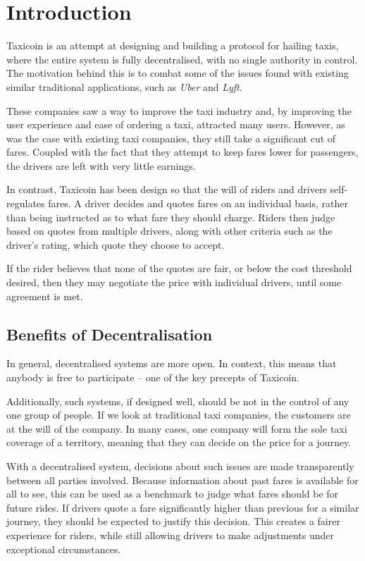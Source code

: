 \section{Introduction}

Taxicoin is an attempt at designing and building a protocol for hailing taxis, where the entire system is fully decentralised, with no single authority in control. The motivation behind this is to combat some of the issues found with existing similar traditional applications, such as \textit{Uber} and \textit{Lyft}.

These companies saw a way to improve the taxi industry and, by improving the user experience and ease of ordering a taxi, attracted many users. However, as was the case with existing taxi companies, they still take a significant cut of fares. Coupled with the fact that they attempt to keep fares lower for passengers, the drivers are left with very little earnings.

In contrast, Taxicoin has been design so that the will of riders and drivers self-regulates fares. A driver decides and quotes fares on an individual basis, rather than being instructed as to what fare they should charge. Riders then judge based on quotes from multiple drivers, along with other criteria such as the driver's rating, which quote they choose to accept.

If the rider believes that none of the quotes are fair, or below the cost threshold desired, then they may negotiate the price with individual drivers, until some agreement is met.

\subsection{Benefits of Decentralisation}

In general, decentralised systems are more open. In context, this means that anybody is free to participate -- one of the key precepts of Taxicoin.

Additionally, such systems, if designed well, should be not in the control of any one group of people. If we look at traditional taxi companies, the customers are at the will of the company. In many cases, one company will form the sole taxi coverage of a territory, meaning that they can decide on the price for a journey.

With a decentralised system, decisions about such issues are made transparently between all parties involved. Because information about past fares is available for all to see, this can be used as a benchmark to judge what fares should be for future rides. If drivers quote a fare significantly higher than previous for a similar journey, they should be expected to justify this decision. This creates a fairer experience for riders, while still allowing drivers to make adjustments under exceptional circumstances.

